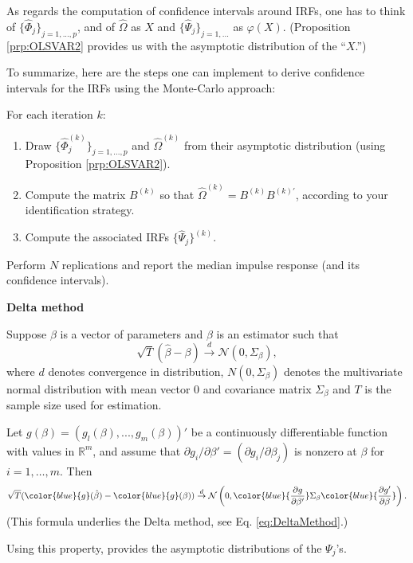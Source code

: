 \documentclass[
  12pt,
]{book}
\providecommand{\tightlist}{%
  \setlength{\itemsep}{0pt}\setlength{\parskip}{0pt}}
\theoremstyle{definition}
\theoremstyle{definition}
\theoremstyle{definition}
\theoremstyle{definition}
\theoremstyle{remark}
\begin{document}
As regards the computation of confidence intervals around IRFs, one has to think of \(\{\widehat{\Phi}_j\}_{j=1,...,p}\), and of \(\widehat{\Omega}\) as \(X\) and \(\{\widehat{\Psi}_j\}_{j=1,...}\) as \(\varphi(X)\). (Proposition \ref{prp:OLSVAR2} provides us with the asymptotic distribution of the ``\(X\).'')

To summarize, here are the steps one can implement to derive confidence intervals for the IRFs using the Monte-Carlo approach:

For each iteration \(k\):

\begin{enumerate}
\def\labelenumi{\arabic{enumi}.}
\tightlist
\item
  Draw \(\{\widehat{\Phi}_j^{(k)}\}_{j=1,...,p}\) and \(\widehat{\Omega}^{(k)}\) from their asymptotic distribution (using Proposition \ref{prp:OLSVAR2}).
\item
  Compute the matrix \(B^{(k)}\) so that \(\widehat{\Omega}^{(k)}=B^{(k)}B^{(k)'}\), according to your identification strategy.
\item
  Compute the associated IRFs \(\{\widehat{\Psi}_j\}^{(k)}\).
\end{enumerate}

Perform \(N\) replications and report the median impulse response (and its confidence intervals).

\textbf{Delta method}

Suppose \(\beta\) is a vector of parameters and \(\beta\) is an estimator such that
\[
\sqrt{T}(\hat\beta-\beta)\overset{d}{\rightarrow}\mathcal{N}(0,\Sigma_\beta),
\]
where \(d\) denotes convergence in distribution, \(N(0,\Sigma_\beta)\) denotes the multivariate normal distribution with mean vector 0 and covariance matrix \(\Sigma_\beta\) and \(T\) is the sample size used for estimation.

Let \(g(\beta) = (g_l(\beta),..., g_m(\beta))'\) be a continuously differentiable function with values in \(\mathbb{R}^m\), and assume that \(\partial g_i/\partial \beta' = (\partial g_i/\partial \beta_j)\) is nonzero at \(\beta\) for \(i = 1,\dots, m\). Then
\[
\sqrt{T}(\color{blue}{g}(\hat\beta)-\color{blue}{g}(\beta))\overset{d}{\rightarrow}\mathcal{N}\left(0,\color{blue}{\frac{\partial g}{\partial \beta'}}\Sigma_\beta\color{blue}{\frac{\partial g'}{\partial \beta}}\right).
\]
(This formula underlies the Delta method, see Eq. \eqref{eq:DeltaMethod}.)

Using this property, \citet{Lutkepohl_1990} provides the asymptotic distributions of the \(\Psi_j\)'s.
\end{document}
